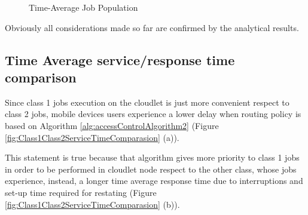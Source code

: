 \documentclass[10pt,a4paper]{article}
\begin{document}
\begin{figure}[h!]
    \centering
    \caption{Time-Average Job Population}%
    \label{fig:JobsNumberComparasion}
\end{figure}

Obviously all considerations made so far are confirmed by the analytical results.

\subsection{Time Average service/response time comparison}

Since class 1 jobs execution on the cloudlet is just more convenient respect to class 2 jobs, mobile devices users experience a lower delay when routing policy is based on Algorithm \ref{alg:accessControlAlgorithm2} (Figure \ref{fig:Class1Class2ServiceTimeComparasion} (a)).

This statement is true because that algorithm gives more priority to class 1 jobs in order to be performed in cloudlet node respect to the other class, whose jobs experience, instead, a longer time average response time due to interruptions and set-up time required for restating (Figure \ref{fig:Class1Class2ServiceTimeComparasion} (b)).
\end{document}
